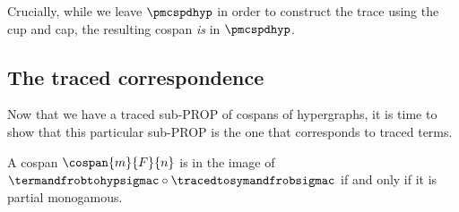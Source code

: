 Crucially, while we leave \(\pmcspdhyp\) in order to construct the trace using
the cup and cap, the resulting cospan \emph{is} in \(\pmcspdhyp\).

\subsection{The traced correspondence}

Now that we have a traced sub-PROP of cospans of hypergraphs, it is time to show
that this particular sub-PROP is the one that corresponds to traced terms.

\begin{theorem}\label{thm:termtohyp-image}
    A cospan \(\cospan{m}{F}{n}\) is in the image of \(
        \termandfrobtohypsigmac \circ \tracedtosymandfrobsigmac\) if
    and only if it is partial monogamous.
\end{theorem}
